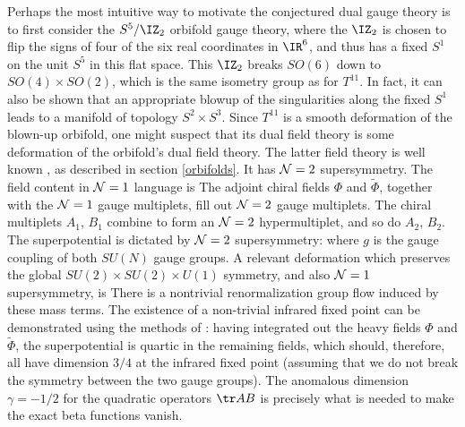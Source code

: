 Perhaps the most intuitive way to motivate the conjectured dual gauge
theory \cite{Klebanov:1998hh} is to first consider the $S^5/\IZ_2$
orbifold gauge theory, where the $\IZ_2$ is chosen to flip the signs of
four of the six real coordinates in $\IR^6$, and thus has a fixed $S^1$ on
the unit $S^5$ in this flat space.  This $\IZ_2$ breaks $SO(6)$ down to
$SO(4) \times SO(2)$, which is the same isometry group as for $T^{11}$.  In
fact, it can also be shown that an appropriate blowup of the singularities
along the fixed $S^1$ leads to a manifold of topology $S^2 \times S^3$.
Since $T^{11}$ is a smooth deformation of the blown-up orbifold, one might
suspect that its dual field theory is some deformation of the orbifold's
dual field theory.  The latter field theory is well known
\cite{Kachru:1998ys}, as described in section \ref{orbifolds}.  
It has ${\cal N}=2$ supersymmetry.  The field
content in ${\cal N}=1$ language is
 The adjoint chiral fields $\Phi$ and $\tilde{\Phi}$, together with the
${\cal N}=1$ gauge multiplets, fill out ${\cal N}=2$ gauge multiplets.
The chiral multiplets $A_1$, $B_1$ combine to form an ${\cal N}=2$
hypermultiplet, and so do $A_2$, $B_2$.  The superpotential is
dictated by ${\cal N}=2$ supersymmetry:
where $g$ is the gauge coupling of both $SU(N)$ gauge groups.
 A relevant deformation which preserves the global $SU(2) \times SU(2)
\times U(1)$ symmetry, and also ${\cal N}=1$ supersymmetry, is
 There is a nontrivial renormalization group flow induced by these mass
terms.  The existence of a non-trivial
infrared fixed point can be demonstrated using
the methods of \cite{Leigh:1995ep}: having integrated out the heavy fields
$\Phi$ and $\tilde\Phi$, the superpotential is quartic in the remaining
fields, which should, therefore, all have dimension $3/4$ at the
infrared fixed point (assuming that we
do not break the symmetry between the two gauge groups).  The anomalous
dimension $\gamma = -1/2$ for the quadratic operators $\tr AB$ is precisely
what is needed to make the exact beta functions vanish.

